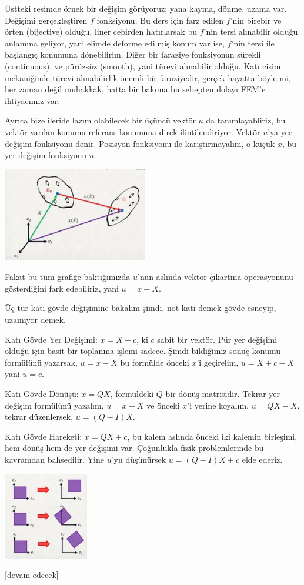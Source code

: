 \documentclass[12pt,fleqn]{article}\usepackage{../../common}
\begin{document}
Üstteki resimde örnek bir değişim görüyoruz; yana kayma, dönme, uzama
var. Değişimi gerçekleştiren $f$ fonksiyonu. Bu ders için farz edilen $f$'nin
birebir ve örten (bijective) olduğu, liner cebirden hatırlarsak bu $f$'nin tersi
alınabilir olduğu anlamına geliyor, yani elimde deforme edilmiş konum var ise,
$f$'nin tersi ile başlangıç konumuna dönebilirim. Diğer bir faraziye fonksiyonun
sürekli (continuous), ve pürüzsüz (smooth), yani türevi alınabilir olduğu. Katı
cisim mekaniğinde türevi alınabilirlik önemli bir faraziyedir, gerçek hayatta
böyle mi, her zaman değil muhakkak, hatta bir bakıma bu sebepten dolayı FEM'e
ihtiyacımız var.

Ayrıca bize ileride lazım olabilecek bir üçüncü vektör $u$ da tanımlayabliriz,
bu vektör varılan konumu referans konumuna direk ilintilendiriyor. Vektör $u$'ya
yer değişim fonksiyonu denir. Pozisyon fonksiyonu ile karıştırmayalım, o küçük
$x$, bu yer değişim fonksiyonu $u$.

\includegraphics[width=17em]{phy_020_strs_01_05.jpg}

Fakat bu tüm grafiğe baktığımızda $u$'nun aslında vektör çıkartma operasyonunu
gösterdiğini fark edebiliriz, yani $u = x - X$.

Üç tür katı gövde değişimine bakalım şimdi, not katı demek gövde esneyip,
uzamıyor demek.

Katı Gövde Yer Değişimi: $x = X + c$, ki $c$ sabit bir vektör. Pür yer değişimi
olduğu için basit bir toplanma işlemi sadece. Şimdi bildiğimiz sonuç konumu
formülünü yazarsak, $u = x - X$ bu formülde önceki $x$'i geçirelim, $u = X + c -
X$ yani $u = c$.

Katı Gövde Dönüşü: $x = Q X$, formüldeki $Q$ bir dönüş matrisidir. Tekrar yer
değişim formülünü yazalım, $u = x - X$ ve önceki $x$'i yerine koyalım, $u = QX -
X$, tekrar düzenlersek, $u = (Q-I)X$.

Katı Gövde Hareketi: $x = QX + c$, bu kalem aslında önceki iki kalemin
birleşimi, hem dönüş hem de yer değişimi var. Çoğunlukla fizik problemlerinde bu
kavramdan bahsedilir. Yine $u$'yu düşünürsek $u = (Q-I)X + c$ elde ederiz.

\includegraphics[width=10em]{phy_020_strs_01_04.jpg}















[devam edecek]
\end{document}
